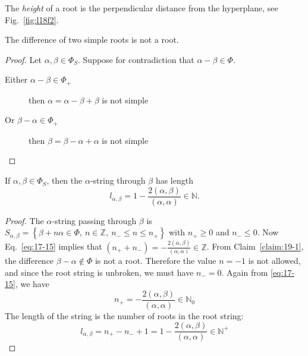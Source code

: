 
\begin{definition}[height]
  The \emph{height} of a root is the perpendicular distance from the hyperplane, see Fig.~\ref{fig:l18f2}.
\end{definition}

\begin{claim}
  \label{claim:19-1}
  The difference of two simple roots is not a root.
\end{claim}
\begin{proof}
  Let $\alpha, \beta \in \Phi_S$.  Suppose for contradiction that $\alpha - \beta \in \Phi$.
  \begin{description}
    \item[Either $\alpha - \beta \in \Phi_+$] then $\alpha = \alpha - \beta + \beta$ is not simple \smashtimes
    \item[Or $\beta - \alpha \in \Phi_+$] then $\beta = \beta - \alpha + \alpha$ is not simple \smashtimes
  \end{description}
\end{proof}
\begin{claim} \label{cl:19-ii}
  If $\alpha, \beta \in \Phi_S$, then the $\alpha$-string through $\beta$ has length
  \begin{equation}
    l_{\alpha, \beta} = 1 - \frac{2(\alpha, \beta)}{(\alpha, \alpha)} \in \mathbb{N}.
  \end{equation}
\end{claim}
\begin{proof}
  The $\alpha$-string passing through $\beta$ is $ S_{\alpha, \beta} = \left\{ \beta + n \alpha \in \Phi, \ n \in \mathbb{Z}, \ n_- \leq n \leq n_+ \right\} $ with $n_+ \geq 0$ and $n_- \leq 0$.
  Now Eq.~\eqref{eq:17-15} implies that $(n_+ + n_-) = -\frac{2 (\alpha, \beta)}{(\alpha, \alpha)} \in \mathbb{Z}$. From Claim~\ref{claim:19-1}, the difference $\beta - \alpha \not \in \Phi$ is not a root. Therefore the value $n = -1$ is not allowed, and since the root string is unbroken, we must have $n_- = 0$.
  Again from \eqref{eq:17-15}, we have
  \begin{equation}
    \label{eq:19-20}
    n_+ = -\frac{2 (\alpha, \beta)}{(\alpha, \alpha)} \in \mathbb{N}_0
  \end{equation}
  The length of the string is the number of roots in the root string:
  \begin{equation}
    l_{\alpha, \beta} = n_+ - n_- + 1 = 1 - \frac{2 (\alpha, \beta)}{(\alpha, \alpha)} \in \mathbb{N}^+
  \end{equation}
\end{proof}
